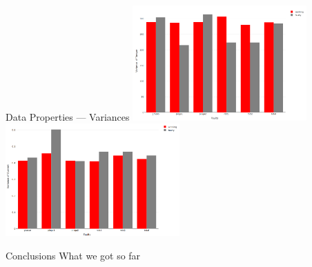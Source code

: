 \documentclass[9pt]{beamer}
\begin{document}
\begin{frame}{Data Properties --- Variances}
\includegraphics[width=0.5\textwidth]{TorqueVar.png}
\includegraphics[width=0.5\textwidth]{CurrentVar.png}
\end{frame}
\begin{frame}{Conclusions}
What we got so far
\end{frame}
\end{document}
